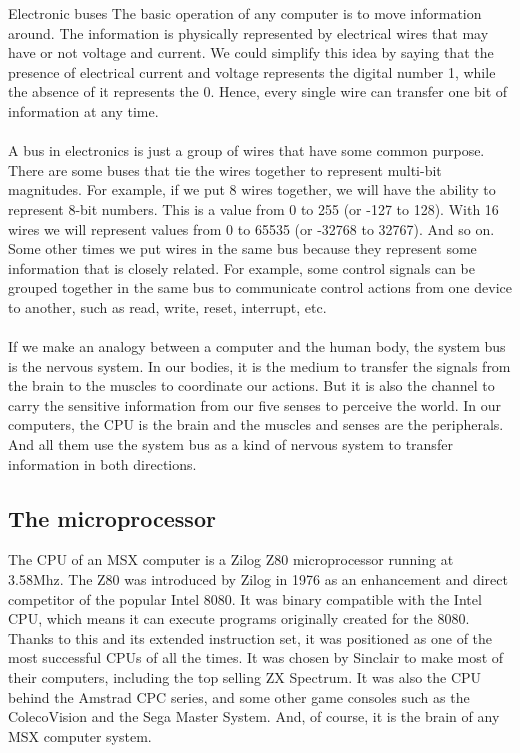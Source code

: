 \begin{theory}{Electronic buses}
	The basic operation of any computer is to move information around. The information is physically represented by electrical wires that may have or not voltage and current. We could simplify this idea by saying that the presence of electrical current and voltage represents the digital number 1, while the absence of it represents the 0. Hence, every single wire can transfer one bit of information at any time.\\\\
	
	A bus in electronics is just a group of wires that have some common purpose. There are some buses that tie the wires together to represent multi-bit magnitudes. For example, if we put 8 wires together, we will have the ability to represent 8-bit numbers. This is a value from 0 to 255 (or -127 to 128). With 16 wires we will represent values from 0 to 65535 (or -32768 to 32767). And so on. Some other times we put wires in the same bus because they represent some information that is closely related. For example, some control signals can be grouped together in the same bus to communicate control actions from one device to another, such as read, write, reset, interrupt, etc. \\\\
	
	If we make an analogy between a computer and the human body, the system bus is the nervous system. In our bodies, it is the medium to transfer the signals from the brain to the muscles to coordinate our actions. But it is also the channel to carry the sensitive information from our five senses to perceive the world. In our computers, the CPU is the brain and the muscles and senses are the peripherals. And all them use the system bus as a kind of nervous system to transfer information in both directions.	
\end{theory}

\subsection{The microprocessor}

The CPU of an MSX computer is a Zilog Z80 microprocessor running at 3.58Mhz. The Z80 was introduced by Zilog in 1976 as an enhancement and direct competitor of the popular Intel 8080. It was binary compatible with the Intel CPU, which means it can execute programs originally created for the 8080. Thanks to this and its extended instruction set, it was positioned as one of the most successful CPUs of all the times. It was chosen by Sinclair to make most of their computers, including the top selling ZX Spectrum. It was also the CPU behind the Amstrad CPC series, and some other game consoles such as the ColecoVision and the Sega Master System. And, of course, it is the brain of any MSX computer system. 

